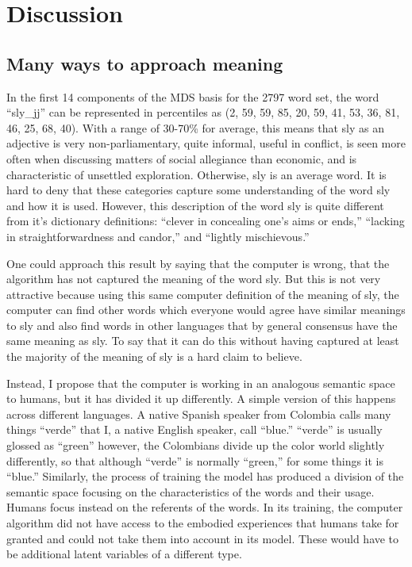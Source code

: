 \documentclass[eric_thesis.tex]{subfiles}
\begin{document}
\chapter{Discussion}

\section{Many ways to approach meaning}

In the first 14 components of the MDS basis for the 2797 word set, the word
``sly\_jj'' can be represented in percentiles as (2, 59, 59, 85, 20, 59, 41, 
53, 36, 81, 46, 25, 68, 40). With a range of 30-70\% for average, this means 
that sly as an adjective is very non-parliamentary, quite informal, useful in 
conflict, is seen more often when discussing matters of social allegiance than
economic, and is characteristic of unsettled exploration. Otherwise, sly is an
average word. It is hard to deny that these categories capture some 
understanding of the word sly and how it is used. However, this description of
the word sly is quite different from it's dictionary definitions: 
``clever in concealing one's aims or ends,'' ``lacking in straightforwardness 
and candor,'' and ``lightly mischievous.'' \citep{SlyMerriamWebster2014}

One could approach this result by saying that the computer is wrong, that the
algorithm has not captured the meaning of the word sly. But this is not very
attractive because using this same computer definition of the meaning of sly,
the computer can find other words which everyone would agree have similar 
meanings to sly and also find words in other languages that by general 
consensus have the same meaning as sly. To say that it can do this without
having captured at least the majority of the meaning of sly is a hard claim
to believe. 

Instead, I propose that the computer is working in an analogous semantic space
to humans, but it has divided it up differently. A simple version of this 
happens across different languages. A native Spanish speaker from Colombia calls 
many things
``verde'' that I, a native English speaker, call ``blue.'' ``verde'' is usually
glossed as ``green'' however, the Colombians divide up the color world slightly
differently, so that although ``verde'' is normally ``green,'' for some things
it is ``blue.'' Similarly, the process of training the \modelname{} model has
produced a division of the semantic space focusing on the characteristics of 
the words and their usage. Humans focus instead on the referents of the words.
In its training, the computer algorithm did not have access to the embodied
experiences that humans take for granted and could not take them into account
in its model. These would have to be additional latent variables of a different
type.
\end{document}
